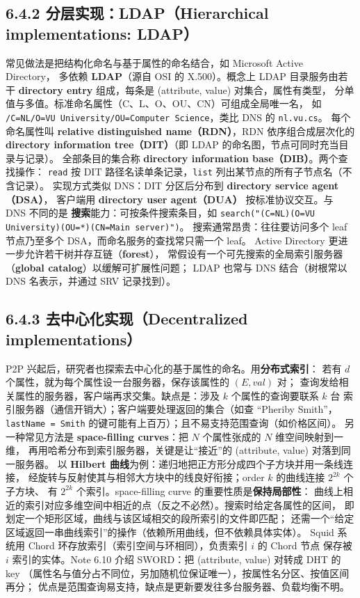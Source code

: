 \subsection*{6.4.2 分层实现：LDAP（Hierarchical implementations: LDAP）}
常见做法是把结构化命名与基于属性的命名结合，如 Microsoft Active Directory，
多依赖 \textbf{LDAP}（源自 OSI 的 X.500）。概念上 LDAP 目录服务由若干
\textbf{directory entry} 组成，每条是 (attribute, value) 对集合，属性有类型，
分单值与多值。标准命名属性（C、L、O、OU、CN）可组成全局唯一名，
如 \texttt{/C=NL/O=VU University/OU=Computer Science}，类比 DNS 的 \texttt{nl.vu.cs}。
每个命名属性叫 \textbf{relative distinguished name（RDN）}，RDN 依序组合成层次化的
\textbf{directory information tree（DIT）}（即 LDAP 的命名图，节点可同时充当目录与记录）。
全部条目的集合称 \textbf{directory information base（DIB）}。两个查找操作：
\texttt{read} 按 DIT 路径名读单条记录，\texttt{list} 列出某节点的所有子节点名（不含记录）。
实现方式类似 DNS：DIT 分区后分布到 \textbf{directory service agent（DSA）}，
客户端用 \textbf{directory user agent（DUA）} 按标准协议交互。与 DNS 不同的是
\textbf{搜索}能力：可按条件搜索条目，如
\texttt{search("(C=NL)(O=VU University)(OU=*)(CN=Main server)")}。
搜索通常昂贵：往往要访问多个 leaf 节点乃至多个 DSA，而命名服务的查找常只需一个 leaf。
Active Directory 更进一步允许若干树并存互链（\textbf{forest}），
常假设有一个可先搜索的全局索引服务器（\textbf{global catalog}）以缓解可扩展性问题；
LDAP 也常与 DNS 结合（树根常以 DNS 名表示，并通过 SRV 记录找到）。

\subsection*{6.4.3 去中心化实现（Decentralized implementations）}
P2P 兴起后，研究者也探索去中心化的基于属性的命名。用\textbf{分布式索引}：
若有 $d$ 个属性，就为每个属性设一台服务器，保存该属性的 $(E, val)$ 对；
查询发给相关属性的服务器，客户端再求交集。缺点是：涉及 $k$ 个属性的查询要联系 $k$ 台
索引服务器（通信开销大）；客户端要处理返回的集合（如查 “Pheriby Smith”，
\texttt{lastName = Smith} 的键可能有上百万）；且不易支持范围查询（如价格区间）。
另一种常见方法是 \textbf{space-filling curves}：把 $N$ 个属性张成的 $N$ 维空间映射到一维，
再用哈希分布到索引服务器，关键是让“接近”的 (attribute, value) 对落到同一服务器。
以 \textbf{Hilbert 曲线}为例：递归地把正方形分成四个子方块并用一条线连接，
经旋转与反射使其与相邻大方块中的线良好衔接；order $k$ 的曲线连接 $2^{2k}$ 个子方块、
有 $2^{2k}$ 个索引。space-filling curve 的重要性质是\textbf{保持局部性}：
曲线上相近的索引对应多维空间中相近的点（反之不必然）。搜索时给定各属性的区间，
即划定一个矩形区域，曲线与该区域相交的段所索引的文件即匹配；
还需一个“给定区域返回一串曲线索引”的操作（依赖所用曲线，但不依赖具体实体）。
Squid 系统用 Chord 环存放索引（索引空间与环相同），负责索引 $i$ 的 Chord 节点
保存被 $i$ 索引的实体。Note 6.10 介绍 SWORD：把 (attribute, value) 对转成 DHT 的 key
（属性名与值分占不同位，另加随机位保证唯一），按属性名分区、按值区间再分；
优点是范围查询易支持，缺点是更新要发往多台服务器、负载均衡不明。


